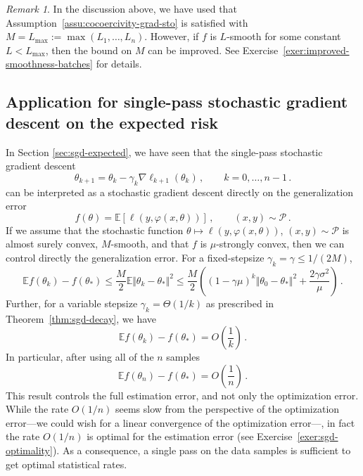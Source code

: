 \documentclass[11pt,reqno]{article}
\newcommand{\E}{\mathbb{E}}
\newcommand{\cP}{\mathcal{P}}
\renewcommand{\leq}{\leqslant}
\numberwithin{equation}{section}
\theoremstyle{plain}
\theoremstyle{definition}
\theoremstyle{remark}
\newtheorem{remark}[assumption]{Remark}
\begin{document}
\begin{remark}
	In the discussion above, we have used that Assumption~\ref{assu:cocoercivity-grad-sto} is satisfied with $M = L_{\max} := \max(L_1, \dots, L_n)$. However, if $f$ is $L$-smooth for some constant $L < L_{\max}$, then the bound on $M$ can be improved. See Exercise~\ref{exer:improved-smoothness-batches} for details.
\end{remark}

\subsection{Application for single-pass stochastic gradient descent on the expected risk}
\label{sec:analysis-sgd-expected}

In Section \ref{sec:sgd-expected}, we have seen that the single-pass stochastic gradient descent 
\begin{equation*}
	\theta_{k+1} = \theta_{k} - \gamma_k \nabla \ell_{k+1}(\theta_{k}) \, , \qquad k = 0, \dots, n-1\, .
\end{equation*}
can be interpreted as a stochastic gradient descent directly on the generalization error
\begin{equation*}
	f(\theta) = \E \left[\ell(y,\varphi(x, \theta)) \right]\, , \qquad (x,y) \sim \cP \, .
\end{equation*}
If we assume that the stochastic function $\theta \mapsto \ell(y,\varphi(x,\theta))$, $(x,y)\sim \cP$ is almost surely convex, $M$-smooth, and that $f$ is $\mu$-strongly convex, then we can control directly the generalization error. For a fixed-stepsize $\gamma_k = \gamma \leq 1/(2M)$,
\begin{equation*}
	\E f(\theta_k) - f(\theta_*) \leq \frac{M}{2} \E \Vert \theta_k - \theta_* \Vert^2 \leq \frac{M}{2} \left( (1 - \gamma \mu)^k \Vert \theta_0 - \theta_* \Vert^2 + \frac{2\gamma \sigma^2}{\mu} \right) \, .
\end{equation*}
Further, for a variable stepsize $\gamma_k = \Theta(1/k)$ as prescribed in Theorem~\ref{thm:sgd-decay}, we have 
\begin{equation*}
	\E f(\theta_k) - f(\theta_*) = O\left(\frac{1}{k}\right) \, .
\end{equation*}
In particular, after using all of the $n$ samples 
\begin{equation*}
	\E f(\theta_n) - f(\theta_*) = O\left(\frac{1}{n}\right) \, .
\end{equation*}
This result controls the full estimation error, and not only the optimization error. While the rate $O(1/n)$ seems slow from the perspective of the optimization error---we could wish for a linear convergence of the optimization error---, in fact the rate $O(1/n)$ is optimal for the estimation error (see Exercise~\ref{exer:sgd-optimality}). As a consequence, a single pass on the data samples is sufficient to get optimal statistical rates. 
\end{document}
